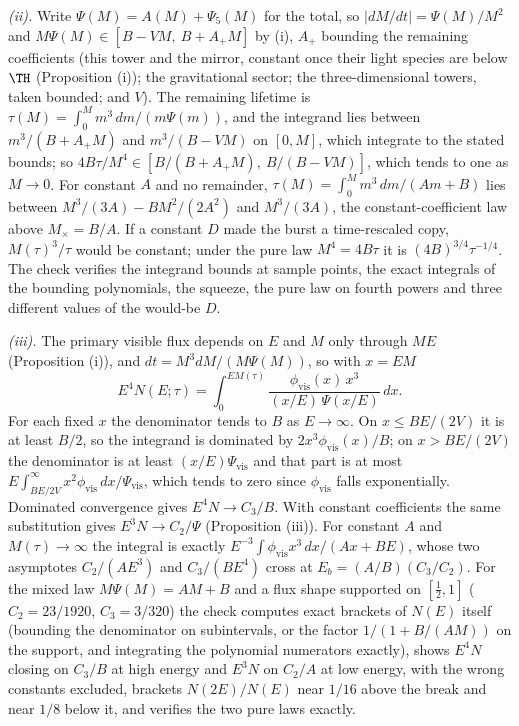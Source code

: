 \emph{(ii).} Write $\Psi(M) = A(M) + \Psi_{5}(M)$ for the total, so $|dM/dt| = \Psi(M)/M^{2}$ and $M\Psi(M) \in [B - VM,\ B + A_{+}M]$ by (i), $A_{+}$ bounding the remaining coefficients (this tower and the mirror, constant once their light species are below $\TH$ (Proposition (i)); the gravitational sector; the three-dimensional towers, taken bounded; and $V$). The remaining lifetime is $\tau(M) = \int_{0}^{M} m^{3}\,dm/(m\Psi(m))$, and the integrand lies between $m^{3}/(B + A_{+}M)$ and $m^{3}/(B - VM)$ on $[0, M]$, which integrate to the stated bounds; so $4B\tau/M^{4} \in [B/(B + A_{+}M),\ B/(B - VM)]$, which tends to one as $M \to 0$. For constant $A$ and no remainder, $\tau(M) = \int_{0}^{M}m^{3}\,dm/(Am + B)$ lies between $M^{3}/(3A) - BM^{2}/(2A^{2})$ and $M^{3}/(3A)$, the constant-coefficient law above $M_{\times} = B/A$. If a constant $D$ made the burst a time-rescaled copy, $M(\tau)^{3}/\tau$ would be constant; under the pure law $M^{4} = 4B\tau$ it is $(4B)^{3/4}\tau^{-1/4}$. The check verifies the integrand bounds at sample points, the exact integrals of the bounding polynomials, the squeeze, the pure law on fourth powers and three different values of the would-be $D$.

\emph{(iii).} The primary visible flux depends on $E$ and $M$ only through $ME$ (Proposition (i)), and $dt = M^{3}dM/(M\Psi(M))$, so with $x = EM$
\[
E^{4}N(E;\tau) = \int_{0}^{EM(\tau)}\frac{\phi_{\mathrm{vis}}(x)\,x^{3}}{(x/E)\,\Psi(x/E)}\,dx .
\]
For each fixed $x$ the denominator tends to $B$ as $E \to \infty$. On $x \le BE/(2V)$ it is at least $B/2$, so the integrand is dominated by $2x^{3}\phi_{\mathrm{vis}}(x)/B$; on $x > BE/(2V)$ the denominator is at least $(x/E)\Psi_{\mathrm{vis}}$ and that part is at most $E\int_{BE/2V}^{\infty}x^{2}\phi_{\mathrm{vis}}\,dx/\Psi_{\mathrm{vis}}$, which tends to zero since $\phi_{\mathrm{vis}}$ falls exponentially. Dominated convergence gives $E^{4}N \to C_{3}/B$. With constant coefficients the same substitution gives $E^{3}N \to C_{2}/\Psi$ (Proposition (iii)). For constant $A$ and $M(\tau) \to \infty$ the integral is exactly $E^{-3}\int\phi_{\mathrm{vis}}x^{3}\,dx/(Ax + BE)$, whose two asymptotes $C_{2}/(AE^{3})$ and $C_{3}/(BE^{4})$ cross at $E_{b} = (A/B)(C_{3}/C_{2})$. For the mixed law $M\Psi(M) = AM + B$ and a flux shape supported on $[\tfrac12, 1]$ ($C_{2} = 23/1920$, $C_{3} = 3/320$) the check computes exact brackets of $N(E)$ itself (bounding the denominator on subintervals, or the factor $1/(1 + B/(AM))$ on the support, and integrating the polynomial numerators exactly), shows $E^{4}N$ closing on $C_{3}/B$ at high energy and $E^{3}N$ on $C_{2}/A$ at low energy, with the wrong constants excluded, brackets $N(2E)/N(E)$ near $1/16$ above the break and near $1/8$ below it, and verifies the two pure laws exactly.

